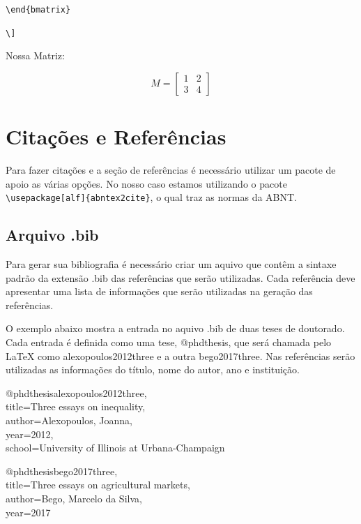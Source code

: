 \documentclass[12pt,oneside,a4paper,chapter=TITLE,english,brazil,sumario=abnt-6027-2012]{abntex2}
\begin{document}
\verb|\end{bmatrix}|

\verb|\]|

\vspace{0.4cm}

Nossa Matriz:

\vspace{0.2cm}
\[
	M=
	\begin{bmatrix}
		1 & 2   \\
		3 & 4 
	\end{bmatrix}
\]




\section{Citações e Referências}\label{citaebib}

{\tiny }

Para fazer citações e a seção de referências é necessário utilizar um pacote de apoio as várias opções. No nosso caso estamos utilizando o pacote \verb|\usepackage[alf]{abntex2cite}|, o qual traz as normas da ABNT.

\subsection{Arquivo .bib}

Para gerar sua bibliografia é necessário criar um aquivo que contêm a sintaxe padrão da extensão .bib das referências que serão utilizadas. Cada referência deve apresentar uma lista de informações que serão utilizadas na geração das referências. 

O exemplo abaixo mostra a entrada no aquivo .bib de duas teses de doutorado. Cada entrada é definida como uma tese, @phdthesis, que será chamada pelo {\LaTeX} como alexopoulos2012three e a outra bego2017three. Nas referências serão utilizadas as informações do título, nome do autor, ano e instituição.  

\vspace{1cm}
{
\noindent
@phdthesis{alexopoulos2012three,\\
title={Three essays on inequality},\\
author={Alexopoulos, Joanna},\\
year={2012},\\
school={University of Illinois at Urbana-Champaign}\\
}
}

\vspace{1cm}
{
\noindent
@phdthesis{bego2017three,\\
title={Three essays on agricultural markets},\\
author={Bego, Marcelo da Silva},\\
year={2017}\\
}
}
\end{document}
